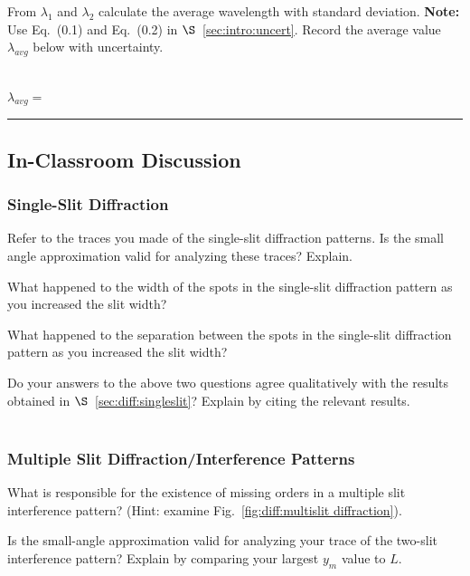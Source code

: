 \noindent
From $\lambda _1$ and $\lambda _2$ calculate the average wavelength
with standard deviation. {\bf Note:} Use Eq.~(0.1) and Eq.~(0.2) in
$\S$~\ref{sec:intro:uncert}. Record the average value $\lambda
_{avg}$ below with uncertainty. \\
\vspace*{3cm} \\ 
\begin{center}
$\lambda _{avg}=$~ \rule{3cm}{.1mm}
\end{center}

\subsection{In-Classroom Discussion}
\subsubsection{Single-Slit Diffraction}
Refer to the traces you made of the single-slit diffraction patterns.
Is the small angle approximation valid for analyzing these traces?
Explain.
\vspace*{2cm}

\noindent 
What happened to the width of the spots in the single-slit diffraction
pattern as you increased the slit width?
\vspace*{2cm}

\noindent
What happened to the separation between the spots in the single-slit
diffraction pattern as you increased the slit width?
\vspace*{2cm}

\noindent
Do your answers to the above two questions agree qualitatively with
the results obtained in 
$\S$~\ref{sec:diff:singleslit}? Explain by citing the relevant results. \\
\vspace*{2cm} \\

\subsubsection{Multiple Slit Diffraction/Interference Patterns}
What is responsible for the existence of missing orders in a multiple
slit interference pattern? (Hint: examine 
Fig.~\ref{fig:diff:multislit diffraction}).  
\vspace*{1.4cm} 

\noindent
Is the small-angle approximation valid for analyzing your trace of the
two-slit interference pattern? Explain by comparing your largest
$y_m$ value to $L.$
\vspace*{3cm}

